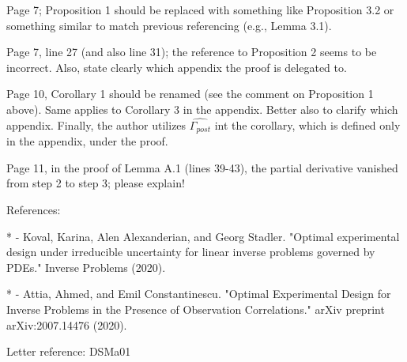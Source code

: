 \documentclass{amsart}
\begin{document}
Page 7; Proposition 1 should be replaced with something like
Proposition 3.2 or something similar to match previous referencing
(e.g., Lemma 3.1).
%

Page 7, line 27 (and also line 31); the reference to Proposition 2
seems to be incorrect. Also, state clearly which appendix the proof is
delegated to.
%

Page 10, Corollary 1 should be renamed (see the comment on Proposition
1 above). Same applies to Corollary 3 in the appendix. Better also to
clarify which appendix. Finally, the author utilizes
$\widehat{\Gamma_{post}}$ int the corollary, which is defined only in
the appendix, under the proof.
%

Page 11, in the proof of Lemma A.1 (lines 39-43), the partial
derivative vanished from step 2 to step 3; please explain!
%

References:

* - Koval, Karina, Alen Alexanderian, and Georg
Stadler. "Optimal experimental design under irreducible uncertainty
for linear inverse problems governed by PDEs." Inverse Problems
(2020).

* - Attia, Ahmed, and Emil Constantinescu. "Optimal Experimental
Design for Inverse Problems in the Presence of Observation
Correlations." arXiv preprint arXiv:2007.14476 (2020).

Letter reference: DSMa01
\end{document}
